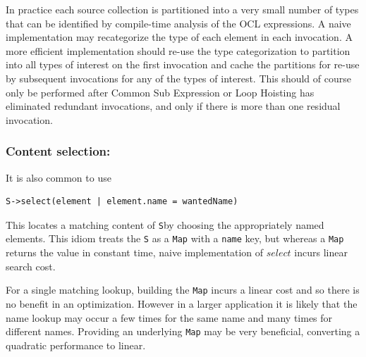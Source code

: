 \documentclass{llncs}
\begin{document}
In practice each source collection is partitioned into a very small number of types that can be identified by compile-time analysis of the OCL expressions. A naive implementation may recategorize the type of each element in each invocation. A more efficient implementation should re-use the type categorization to partition into all types of interest on the first invocation and cache the partitions for re-use by subsequent invocations for any of the types of interest. This should of course only be performed after Common Sub Expression or Loop Hoisting has eliminated redundant invocations, and only if there is more than one residual invocation.

\subsubsection{Content selection:}

It is also common to use

\begin{verbatim}
S->select(element | element.name = wantedName)
\end{verbatim}

This locates a matching content of \verb$S$by choosing the appropriately named elements. This idiom treats the \verb$S$ as a \verb$Map$ with a \verb$name$ key, but whereas a \verb$Map$ returns the value in constant time, naive implementation of $select$ incurs linear search cost.

For a single matching lookup, building the \verb$Map$ incurs a linear cost and so there is no benefit in an optimization. However in a larger application it is likely that the name lookup may occur a few  times for the same name and many times for different names. Providing an underlying \verb$Map$ may be very beneficial, converting a quadratic performance to linear.

\end{document}
